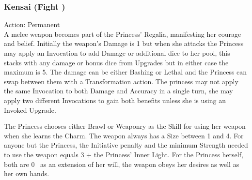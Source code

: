 \subsubsection*{Kensai (Fight \textbullet)}

\noindent Action: Permanent \\

\noindent A melee weapon becomes part of the Princess’ Regalia, manifesting her courage and belief. Initially the weapon's Damage is 1 but when she attacks the Princess may apply an Invocation to add Damage or additional dice to her pool, this stacks with any damage or bonus dice from Upgrades but in either case the maximum is 5. The damage can be either Bashing or Lethal and the Princess can swap between them with a Transformation action. The princess may not apply the same Invocation to both Damage and Accuracy in a single turn, she may apply two different Invocations to gain both benefits unless she is using an Invoked Upgrade. 

The Princess chooses either Brawl or Weaponry as the Skill for using her weapon when she learns the Charm. The weapon always has a Size between 1 and 4. For anyone but the Princess, the Initiative penalty and the minimum Strength needed to use the weapon equals 3 + the Princess' Inner Light. For the Princess herself, both are 0 \textendash\, as an extension of her will, the weapon obeys her desires as well as her own hands.

